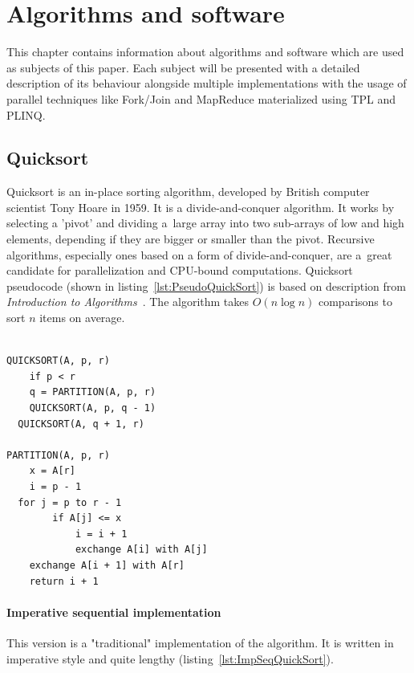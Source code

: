 \chapter{Algorithms and software}
\label{chap:4}
This chapter contains information about algorithms and software which are used as subjects of this paper. Each subject will be presented with a detailed description of its behaviour alongside multiple implementations with the usage of parallel techniques like Fork/Join and MapReduce materialized using TPL and PLINQ.

\section{Quicksort}
\label{sec: QuickSortImp}
Quicksort is an in-place sorting algorithm, developed by British computer scientist Tony Hoare in 1959. It is a divide-and-conquer algorithm. It works by selecting a 'pivot' and dividing a~large array into two sub-arrays of low and high elements, depending if they are bigger or smaller than the pivot. Recursive algorithms, especially ones based on a form of divide-and-conquer, are a~great candidate for parallelization and CPU-bound computations. Quicksort pseudocode (shown in listing~\ref{lst:PseudoQuickSort}) is based on description from \emph{Introduction to Algorithms}~\cite{Cormen2009}. The algorithm takes $O(n \log n)$ comparisons to sort $n$ items on average.

\begin{lstlisting}[basicstyle=\ttfamily\small, caption={Sequential \texttt{quicksort} pseudocode}, label={lst:PseudoQuickSort}]

QUICKSORT(A, p, r)
	if p < r
	q = PARTITION(A, p, r)
	QUICKSORT(A, p, q - 1)
  QUICKSORT(A, q + 1, r)
	
PARTITION(A, p, r)
	x = A[r]
	i = p - 1
  for j = p to r - 1
		if A[j] <= x
			i = i + 1
			exchange A[i] with A[j]
	exchange A[i + 1] with A[r]
	return i + 1
\end{lstlisting}

\subsubsection{Imperative sequential implementation}
This version is a "traditional" implementation of the algorithm. It is written in imperative style and quite lengthy (listing~\ref{lst:ImpSeqQuickSort}).

